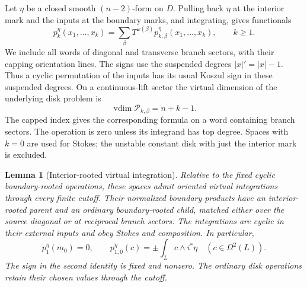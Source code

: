 \documentclass[11pt]{article}
\numberwithin{equation}{section}
\newtheorem{lemma}[theorem]{Lemma}
\theoremstyle{definition}
\theoremstyle{remark}
\begin{document}
Let $\eta$ be a closed smooth $(n-2)$-form on $D$.  Pulling back $\eta$
at the interior mark and the inputs at the boundary marks, and
integrating, gives functionals
\begin{equation}\label{curv:bulk-derivative}
 p_k^\eta(x_1,\ldots,x_k)
 =\sum_\beta T^{\omega(\beta)}p_{k,\beta}^\eta(x_1,\ldots,x_k),
 \qquad k\geq1.
\end{equation}
We include all words of diagonal and transverse branch sectors, with
their capping orientation lines.  The signs use the suspended degrees
$|x|'=|x|-1$.  Thus a cyclic permutation of the inputs has its usual
Koszul sign in these suspended degrees.  On a continuous-lift sector
the virtual dimension of the underlying disk problem is
\begin{equation}\label{curv:unmarked-dimension}
 \operatorname{vdim}\mathcal P_{k,\beta}=n+k-1.
\end{equation}
The capped index gives the corresponding formula on a word containing
branch sectors.  The operation is zero unless its integrand has top
degree.  Spaces with $k=0$ are used for Stokes; the unstable constant
disk with just the interior mark is excluded.

\begin{lemma}[Interior-rooted virtual integration]\label{curv:stokes}
Relative to the fixed cyclic boundary-rooted operations, these spaces
admit oriented virtual integrations through every finite cutoff.
Their normalized boundary products have an interior-rooted parent
and an ordinary boundary-rooted child, matched either over the source
diagonal or at reciprocal branch sectors.  The integrations are
cyclic in their external inputs and obey Stokes and composition.
In particular,
\begin{equation}\label{curv:pairing-identity}
 p_1^\eta(m_0)=0,
 \qquad
 p_{1,0}^\eta(c)=\pm\int_L c\wedge i^*\eta
 \quad(c\in\Omega^2(L)).
\end{equation}
The sign in the second identity is fixed and nonzero.  The ordinary
disk operations retain their chosen values through the cutoff.
\end{lemma}
\end{document}
